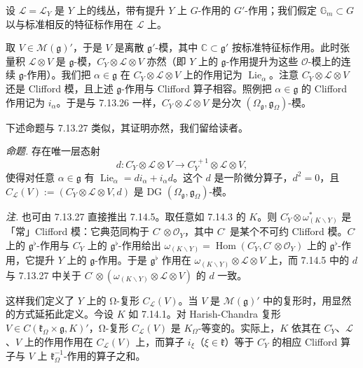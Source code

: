  设 $\mathcal{L}=\mathcal{L}_Y$ 是 $Y$ 上的线丛，带有提升 $Y$ 上 $G$-作用的 $G'$-作用；我们假定 $\mathbb{G}_m\subset G$ 以与标准相反的特征标作用在 $\mathcal{L}$ 上。

取 $V\in\mathcal{M}(\mathfrak{g})'$，于是 $V$ 是离散 $\mathfrak{g}'$-模，其中 $\mathbb{C}\subset\mathfrak{g}'$ 按标准特征标作用。此时张量积 $\mathcal{L}\otimes V$ 是 $\mathfrak{g}$-模，$C_Y^{\cdot}\otimes\mathcal{L}\otimes V$ 亦然（即 $Y$ 上的 $\mathfrak{g}$-作用提升为这些 $\mathcal{O}$-模上的连续 $\mathfrak{g}$-作用）。我们把 $\alpha\in\mathfrak{g}$ 在 $C_Y^{\cdot}\otimes\mathcal{L}\otimes V$ 上的作用记为 $\operatorname{Lie}_{\alpha}$。注意 $C_Y^{\cdot}\otimes\mathcal{L}\otimes V$ 还是 Clifford 模，且上述 $\mathfrak{g}$-作用与 Clifford 算子相容。照例把 $\alpha\in\mathfrak{g}$ 的 Clifford 作用记为 $i_{\alpha}$。于是与 7.13.26 一样，$C_Y^{\cdot}\otimes\mathcal{L}\otimes V$ 是分次 $(\Omega_{\mathfrak{g}},\mathfrak{g}_{\Omega})$-模。

下述命题与 7.13.27 类似，其证明亦然，我们留给读者。

 \emph{命题.} 存在唯一层态射
\[
d:C_Y^{\cdot}\otimes\mathcal{L}\otimes V\to C_Y^{\cdot+1}\otimes\mathcal{L}\otimes V,
\]
使得对任意 $\alpha\in\mathfrak{g}$ 有 $\operatorname{Lie}_{\alpha}=di_{\alpha}+i_{\alpha}d$。这个 $d$ 是一阶微分算子，$d^2=0$，且 $C_{\mathcal{L}}(V):=(C_Y^{\cdot}\otimes\mathcal{L}\otimes V,d)$ 是 DG $(\Omega_{\mathfrak{g}},\mathfrak{g}_{\Omega})$-模。

\emph{注.} 也可由 7.13.27 直接推出 7.14.5。取任意如 7.14.3 的 $K$。则 $C_Y^{\cdot}\otimes\omega^{\ast}_{(K\backslash Y)}$ 是「常」Clifford 模：它典范同构于 $C^{\cdot}\otimes\mathcal{O}_Y$，其中 $C^{\cdot}$ 是某个不可约 Clifford 模。$C^{\cdot}$ 上的 $\mathfrak{g}^{\flat}$-作用与 $C_Y^{\cdot}$ 上的 $\mathfrak{g}^{\flat}$-作用给出 $\omega_{(K\backslash Y)}=\operatorname{Hom}(C_Y^{\cdot},C^{\cdot}\otimes\mathcal{O}_Y)$ 上的 $\mathfrak{g}^{\flat}$-作用，它提升 $Y$ 上的 $\mathfrak{g}$-作用。于是 $\mathfrak{g}^{\flat}$ 作用在 $\omega_{(K\backslash Y)}\otimes\mathcal{L}\otimes V$ 上，而 7.14.5 中的 $d$ 与 7.13.27 中关于 $C^{\cdot}\otimes(\omega_{(K\backslash Y)}\otimes\mathcal{L}\otimes V)$ 的 $d$ 一致。

 这样我们定义了 $Y$ 上的 Ω-复形 $C_{\mathcal{L}}(V)$。当 $V$ 是 $\mathcal{M}(\mathfrak{g})'$ 中的复形时，用显然的方式延拓此定义。今设 $K$ 如 7.14.1。对 Harish-Chandra 复形 $V\in C(\mathfrak{k}_{\Omega}\times\mathfrak{g},K)'$，Ω-复形 $C_{\mathcal{L}}(V)$ 是 $K_{\Omega}$-等变的。实际上，$K$ 依其在 $C_Y^{\cdot}$、$\mathcal{L}$、$V$ 上的作用作用在 $C_{\mathcal{L}}(V)$ 上，而算子 $i_{\xi}$（$\xi\in\mathfrak{k}$）等于 $C_Y^{\cdot}$ 的相应 Clifford 算子与 $V$ 上 $\mathfrak{k}_{\Omega}^{-1}$-作用的算子之和。

